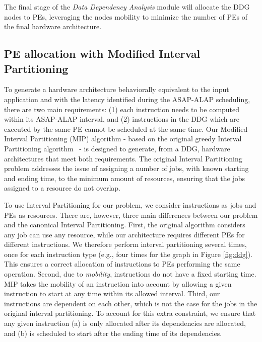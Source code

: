 The final stage of the \textit{Data Dependency Analysis} module will allocate the DDG nodes to PEs, leveraging the nodes mobility to minimize the number of PEs of the final hardware architecture.

\vspace{-2mm}
\subsection{PE allocation with Modified Interval Partitioning}
\label{ssec:modified_interval_partitioning}
\vspace{-1mm}
To generate a hardware architecture behaviorally equivalent to the input application and with the latency identified during the ASAP-ALAP scheduling, there are two main requirements: (1) each instruction needs to be computed within its ASAP-ALAP interval, and (2) instructions in the DDG which are executed by the same PE cannot be scheduled at the same time.
Our Modified Interval Partitioning (MIP) algorithm - based on the original greedy Interval Partitioning algorithm~\cite{greedyIntervalPartitioning} - is designed to generate, from a DDG, hardware architectures that meet both requirements. The original Interval Partitioning problem addresses the issue of assigning a number of jobs, with known starting and ending time, to the minimum amount of resources, ensuring that the jobs assigned to a resource do not overlap.


To use Interval Partitioning for our problem, we consider instructions as jobs and PEs as resources. There are, however, three main differences between our problem and the canonical Interval Partitioning.
First, the original algorithm considers any job can use any resource, while our architecture requires different PEs for different instructions. We therefore perform interval partitioning several times, once for each instruction type (e.g., four times for the graph in Figure \ref{fig:ddg}). This ensures a correct allocation of instructions to PEs performing the same operation.
Second, due to \textit{mobility}, instructions do not have a fixed starting time. MIP takes the mobility of an instruction into account by allowing a given instruction to start at any time within its allowed interval.
Third, our instructions are dependent on each other, which is not the case for the jobs in the original interval partitioning. To account for this extra constraint, we ensure that any given instruction (a) is only allocated after its dependencies are allocated, and (b) is scheduled to start after the ending time of its dependencies.

